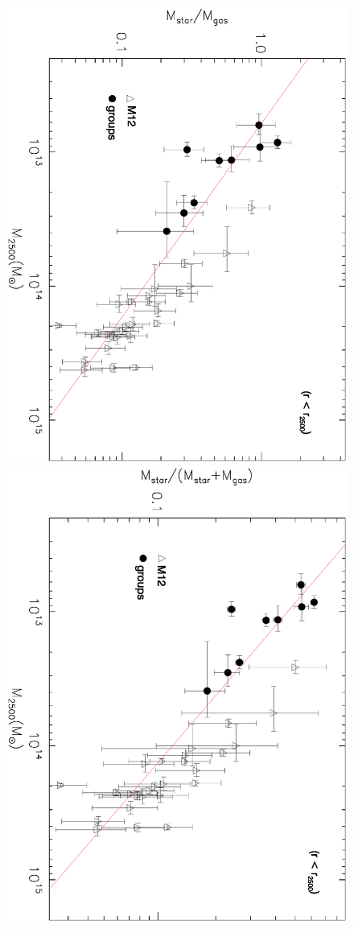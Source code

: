 \documentclass{aa}
\begin{document}
\begin{figure}[ht]
\centering
\includegraphics[angle=90,width=9.cm]{Efficiency_r2500_Novo.ps}
\includegraphics[angle=90,width=9.cm]{Coldbaryons_r2500_Novo.ps}\\

\end{figure}
\end{document}
